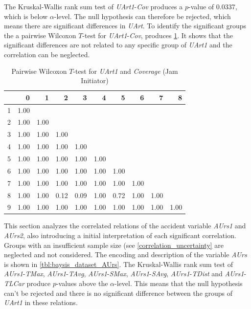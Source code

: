 The Kruskal-Wallis rank sum test of \textit{UArt1}-\textit{Cov} produces a $p$-value of 0.0337, which is below $\alpha$-level. The null hypothesis can therefore be rejected, which means there are significant differences in \textit{UArt}. To identify the significant groups the a pairwise Wilcoxon $T$-test for \textit{UArt1}-\textit{Cov}, produces \cref*{tbl:wilcoxon_baysis_initiator_UArt_Cov}. It shows that the significant differences are not related to any specific group of \textit{UArt1} and the correlation can be neglected.
\begin{table}[ht]
	\tiny
	\centering
    \begin{tabular}{rrrrrrrrrr}
        \toprule
        & 0 & 1 & 2 & 3 & 4 & 5 & 6 & 7 & 8 \\ 
        \midrule
        1 & 1.00 &  &  &  &  &  &  &  &  \\ 
        2 & 1.00 & 1.00 &  &  &  &  &  &  &  \\ 
        3 & 1.00 & 1.00 & 1.00 &  &  &  &  &  &  \\ 
        4 & 1.00 & 1.00 & 1.00 & 1.00 &  &  &  &  &  \\ 
        5 & 1.00 & 1.00 & 1.00 & 1.00 & 1.00 &  &  &  &  \\ 
        6 & 1.00 & 1.00 & 1.00 & 1.00 & 1.00 & 1.00 &  &  &  \\ 
        7 & 1.00 & 1.00 & 1.00 & 1.00 & 1.00 & 1.00 & 1.00 &  &  \\ 
        8 & 1.00 & 1.00 & 0.12 & 0.09 & 1.00 & 0.72 & 1.00 & 1.00 &  \\ 
        9 & 1.00 & 1.00 & 1.00 & 1.00 & 1.00 & 1.00 & 1.00 & 1.00 & 1.00 \\ 
        \bottomrule
      \end{tabular}
    \caption{Pairwise Wilcoxon $T$-test for \textit{UArt1} and \textit{Coverage} (Jam Initiator)}
    \label{tbl:wilcoxon_baysis_initiator_UArt_Cov}
\end{table}

This section analyzes the correlated relations of the accident variable \textit{AUrs1} and \textit{AUrs2}, also introducing a initial interpretation of each significant correlation. Groups with an insufficient sample size (see \cref{correlation_uncertainty} are neglected and not considered. The encoding and description of the variable \textit{AUrs} is shown in \cref{tbl:baysis_dataset_AUrs}. The Kruskal-Wallis rank sum test of \textit{AUrs1}-\textit{TMax}, \textit{AUrs1}-\textit{TAvg}, \textit{AUrs1}-\textit{SMax}, \textit{AUrs1}-\textit{SAvg}, \textit{AUrs1}-\textit{TDist} and \textit{AUrs1}-\textit{TLCar} produce $p$-values above the $\alpha$-level. This means that the null hypothesis can't be rejected and there is no significant difference between the groups of \textit{UArt1} in these relations. 

